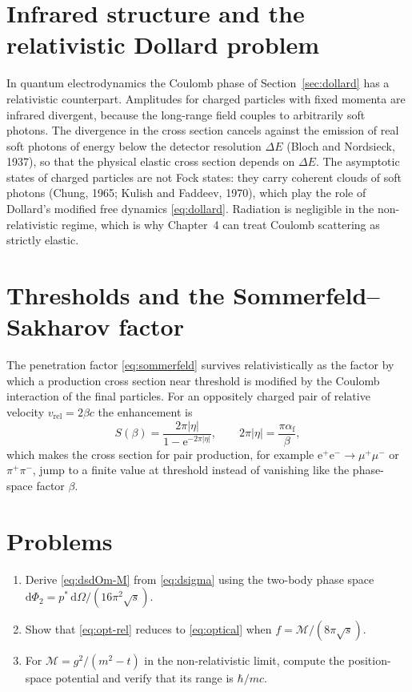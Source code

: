 \documentclass[11pt,a4paper]{book}
\numberwithin{equation}{chapter}
\newcommand{\dd}{\mathrm{d}}
\newcommand{\ee}{\mathrm{e}}
\newcommand{\afs}{\alpha_{\mathrm{f}}}
\begin{document}
\section{Infrared structure and the relativistic Dollard problem}

In quantum electrodynamics the Coulomb phase of Section~\ref{sec:dollard} has a
relativistic counterpart. Amplitudes for charged particles with fixed momenta
are infrared divergent, because the long-range field couples to arbitrarily soft
photons. The divergence in the cross section cancels against the emission of
real soft photons of energy below the detector resolution $\Delta E$ (Bloch and
Nordsieck, 1937), so that the physical elastic cross section depends on
$\Delta E$. The asymptotic states of charged particles are not Fock states: they
carry coherent clouds of soft photons (Chung, 1965; Kulish and Faddeev, 1970),
which play the role of Dollard's modified free dynamics \eqref{eq:dollard}.
Radiation is negligible in the non-relativistic regime, which is why
Chapter~4 can treat Coulomb scattering as strictly elastic.

\section{Thresholds and the Sommerfeld--Sakharov factor}

The penetration factor \eqref{eq:sommerfeld} survives relativistically as the
factor by which a production cross section near threshold is modified by the
Coulomb interaction of the final particles. For an oppositely charged pair of
relative velocity $v_{\mathrm{rel}}=2\beta c$ the enhancement is
\begin{equation}
  S(\beta)=\frac{2\pi|\eta|}{1-\ee^{-2\pi|\eta|}},\qquad
  2\pi|\eta|=\frac{\pi\afs}{\beta},
\end{equation}
which makes the cross section for pair production, for example
$\mathrm e^+\mathrm e^-\to\mu^+\mu^-$ or $\pi^+\pi^-$, jump to a finite value at
threshold instead of vanishing like the phase-space factor $\beta$.

\section{Problems}
\begin{enumerate}
  \item Derive \eqref{eq:dsdOm-M} from \eqref{eq:dsigma} using the two-body phase
        space $\dd\Phi_2=p^*\,\dd\Omega/(16\pi^2\sqrt s)$.
  \item Show that \eqref{eq:opt-rel} reduces to \eqref{eq:optical} when
        $f=\mathcal M/(8\pi\sqrt s)$.
  \item For $\mathcal M=g^2/(m^2-t)$ in the non-relativistic limit, compute the
        position-space potential and verify that its range is $\hbar/mc$.
\end{enumerate}
\end{document}

